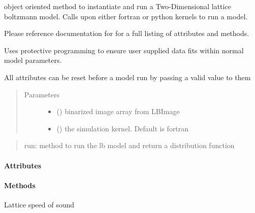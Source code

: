 \documentclass[letterpaper,10pt,english]{sphinxmanual}
\begin{document}
\begin{fulllineitems}
\label{\detokenize{index:lb_colloids.LB.LB_2Dpermeability.LB2DModel}}
object oriented method to instantiate and run a Two-Dimensional
lattice boltzmann model. Calls upon either fortran or python
kernels to run a model.

Please reference documentation for
for a full listing of attributes and methods.

Uses protective programming to ensure user supplied data fits within normal model
parameters.

All attributes can be reset before a model run by passing a valid value to them
\begin{quote}\begin{description}
\item[{Parameters}] \leavevmode\begin{itemize}
\item {} 
 () \textendash{} binarized image array from LBImage

\item {} 
 () \textendash{} the simulation kernel. Default is fortran

\end{itemize}

\end{description}\end{quote}
\begin{quote}

run:  method to run the lb model and return a distribution function
\end{quote}
\paragraph{Attributes}
\paragraph{Methods}

\begin{fulllineitems}
\label{\detokenize{index:lb_colloids.LB.LB_2Dpermeability.LB2DModel.cs}}
 \textendash{} Lattice speed of sound


\end{fulllineitems}
\end{fulllineitems}
\end{document}
